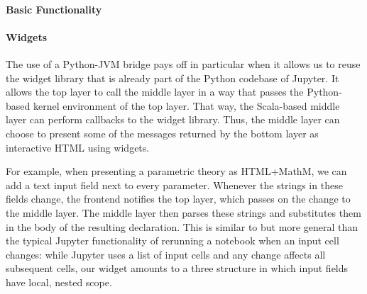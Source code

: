 \paragraph{Basic Functionality}


\paragraph{Widgets}
The use of a Python-JVM bridge pays off in particular when it allows us to reuse the widget library that is already part of the Python codebase of Jupyter.
It allows the top layer to call the middle layer in a way that passes the Python-based kernel environment of the top layer.
That way, the Scala-based middle layer can perform callbacks to the widget library.
Thus, the middle layer can choose to present some of the messages returned by the bottom layer as interactive HTML using widgets.

For example, when presenting a parametric theory as HTML+MathM, we can add a text input field next to every parameter.
Whenever the strings in these fields change, the frontend notifies the top layer, which passes on the change to the middle layer.
The middle layer then parses these strings and substitutes them in the body of the resulting declaration.
This is similar to but more general than the typical Jupyter functionality of rerunning a notebook when an input cell changes: while Jupyter uses a list of input cells and any change affects all subsequent cells, our widget amounts to a three structure in which input fields have local, nested scope.


